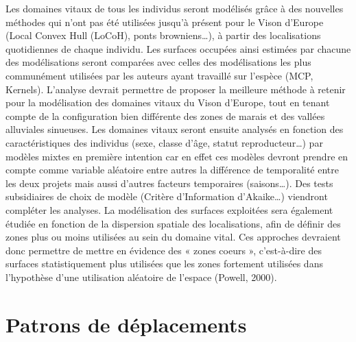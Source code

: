 \documentclass[
  letterpaper,
  DIV=11,
  numbers=noendperiod]{scrreprt}
\begin{document}
Les domaines vitaux de tous les individus seront modélisés grâce à des
nouvelles méthodes qui n'ont pas été utilisées jusqu'à présent pour le
Vison d'Europe (Local Convex Hull (LoCoH), ponts browniens\ldots), à
partir des localisations quotidiennes de chaque individu. Les surfaces
occupées ainsi estimées par chacune des modélisations seront comparées
avec celles des modélisations les plus communément utilisées par les
auteurs ayant travaillé sur l'espèce (MCP, Kernels). L'analyse devrait
permettre de proposer la meilleure méthode à retenir pour la
modélisation des domaines vitaux du Vison d'Europe, tout en tenant
compte de la configuration bien différente des zones de marais et des
vallées alluviales sinueuses. Les domaines vitaux seront ensuite
analysés en fonction des caractéristiques des individus (sexe, classe
d'âge, statut reproducteur\ldots) par modèles mixtes en première
intention car en effet ces modèles devront prendre en compte comme
variable aléatoire entre autres la différence de temporalité entre les
deux projets mais aussi d'autres facteurs temporaires (saisons\ldots).
Des tests subsidiaires de choix de modèle (Critère d'Information
d'Akaike\ldots) viendront compléter les analyses. La modélisation des
surfaces exploitées sera également étudiée en fonction de la dispersion
spatiale des localisations, afin de définir des zones plus ou moins
utilisées au sein du domaine vital. Ces approches devraient donc
permettre de mettre en évidence des « zones coeurs », c'est-à-dire des
surfaces statistiquement plus utilisées que les zones fortement
utilisées dans l'hypothèse d'une utilisation aléatoire de l'espace
(Powell, 2000).

\section{Patrons de déplacements}\label{patrons-de-duxe9placements}
\end{document}
